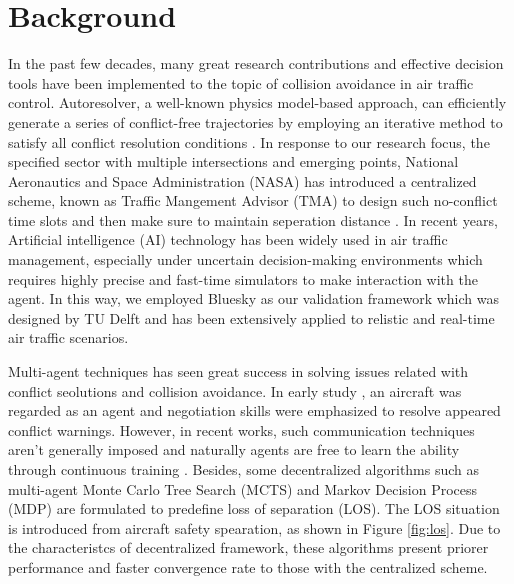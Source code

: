 \section{Background}

In the past few decades, many great research contributions and effective decision tools have been implemented to the topic of collision avoidance in air traffic control. Autoresolver, a well-known physics model-based approach, can efficiently generate a series of conflict-free trajectories by employing an iterative method to satisfy all conflict resolution conditions \citep{farley2007fast}. In response to our research focus, the specified sector with multiple intersections and emerging points, National Aeronautics and Space Administration (NASA) has introduced a centralized scheme, known as Traffic Mangement Advisor (TMA) to design such no-conflict time slots and then make sure to maintain seperation distance \citep{erzberger2014design}. In recent years, Artificial intelligence (AI)    technology has been widely used in air traffic management, especially under uncertain decision-making environments which requires highly precise and fast-time simulators to make interaction with the agent. In this way, we employed Bluesky \citep{hoekstra2016bluesky} as our validation framework which was designed by TU Delft and has been extensively applied to relistic and real-time air traffic scenarios.

Multi-agent techniques has seen great success in solving issues related with conflict seolutions and collision avoidance. In early study \citep{wollkind2004automated}, an aircraft was regarded as an agent and negotiation skills were emphasized to resolve appeared conflict warnings. However, in recent works, such communication techniques aren't generally imposed and naturally agents are free to learn the ability through continuous training \citep{brittain2020deep}. Besides, some decentralized algorithms such as multi-agent Monte Carlo Tree Search (MCTS) \citep{yang2020scalable} and Markov Decision Process (MDP) \citep{bertram2020distributed} are formulated to predefine loss of separation (LOS). The LOS situation is introduced from aircraft safety spearation, as shown in Figure \ref{fig:los}. Due to the characteristcs of decentralized framework, these algorithms present priorer performance and faster convergence rate to those with the centralized scheme.

